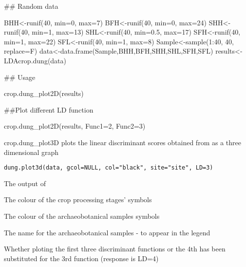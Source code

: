 \documentclass[a4paper]{book}
\begin{document}
%
\begin{SeeAlso}\relax
{}

\end{SeeAlso}
%
\begin{Examples}
\begin{ExampleCode}
## Random data

BHH<-runif(40, min=0, max=7)
BFH<-runif(40, min=0, max=24)
SHH<-runif(40, min=1, max=13)
SHL<-runif(40, min=0.5, max=17)
SFH<-runif(40, min=1, max=22)
SFL<-runif(40, min=1, max=8)
Sample<-sample(1:40, 40, replace=F)
data<-data.frame(Sample,BHH,BFH,SHH,SHL,SFH,SFL)
results<-LDAcrop.dung(data)

## Usage

crop.dung_plot2D(results)

##Plot different LD function

crop.dung_plot2D(results, Func1=2, Func2=3)

\end{ExampleCode}
\end{Examples}
%
\begin{Description}\relax
crop.dung\_plot3D plots the linear discriminant scores obtained from  as a three dimensional graph
\end{Description}
%
\begin{Usage}
\begin{verbatim}
dung.plot3d(data, gcol=NULL, col="black", site="site", LD=3)
\end{verbatim}
\end{Usage}
%
\begin{Arguments}
\begin{ldescription}
\item[\code{data}] The output of 
\item[\code{gcol}] The colour of the crop processing stages' symbols
\item[\code{col}] The colour of the archaeobotanical samples symbols
\item[\code{site}] The name for the archaeobotanical samples - to appear in the legend
\item[\code{LD}] Whether ploting the first three discriminant functions or the 4th has been substituted for the 3rd function (response is LD=4)

\end{ldescription}
\end{Arguments}
\end{document}
